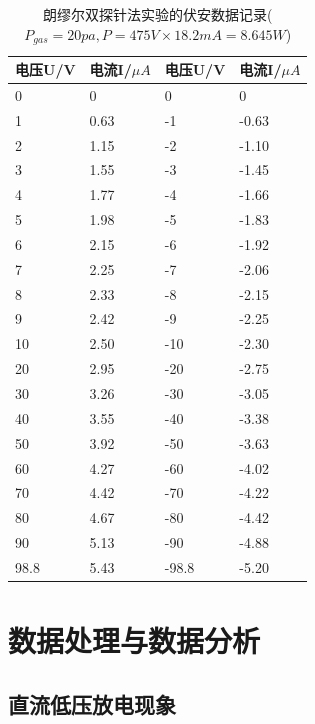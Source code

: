 \documentclass[a4paper,UTF8]{ctexart}
\begin{document}
\begin{table}[H]
    \centering
    \begin{tabular}{|l|l|l|l|}
    \hline
        \textbf{电压U/V} & \textbf{电流I/$\mu A$} & \textbf{电压U/V} & \textbf{电流I/$\mu A$} \\ \hline
        0 & 0 & 0 & 0 \\ \hline
        1 & 0.63 & -1 & -0.63 \\ \hline
        2 & 1.15 & -2 & -1.10 \\ \hline
        3 & 1.55 & -3 & -1.45 \\ \hline
        4 & 1.77 & -4 & -1.66 \\ \hline
        5 & 1.98 & -5 & -1.83 \\ \hline
        6 & 2.15 & -6 & -1.92 \\ \hline
        7 & 2.25 & -7 & -2.06 \\ \hline
        8 & 2.33 & -8 & -2.15 \\ \hline
        9 & 2.42 & -9 & -2.25 \\ \hline
        10 & 2.50 & -10 & -2.30 \\ \hline
        20 & 2.95 & -20 & -2.75 \\ \hline
        30 & 3.26 & -30 & -3.05 \\ \hline
        40 & 3.55 & -40 & -3.38 \\ \hline
        50 & 3.92 & -50 & -3.63 \\ \hline
        60 & 4.27 & -60 & -4.02 \\ \hline
        70 & 4.42 & -70 & -4.22 \\ \hline
        80 & 4.67 & -80 & -4.42 \\ \hline
        90 & 5.13 & -90 & -4.88 \\ \hline
        98.8 & 5.43 & -98.8 & -5.20 \\ \hline
    \end{tabular}
    \caption{朗缪尔双探针法实验的伏安数据记录($P_{gas}=20pa,P=475V\times 18.2mA=8.645W$)}
\end{table}

\section{数据处理与数据分析}

\subsection{直流低压放电现象}
\end{document}
